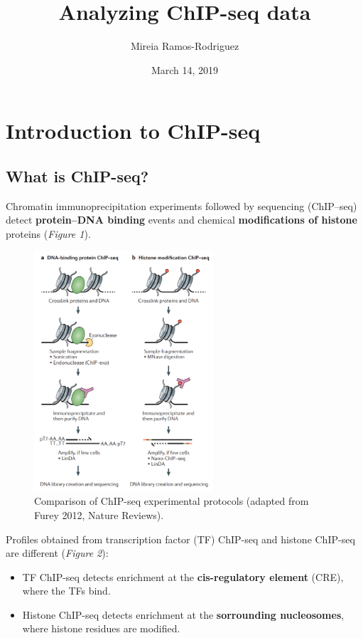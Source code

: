 \documentclass[]{article}
\title{Analyzing ChIP-seq data}
\author{Mireia Ramos-Rodriguez}
\date{March 14, 2019}
\providecommand{\tightlist}{%
  \setlength{\itemsep}{0pt}\setlength{\parskip}{0pt}}
\begin{document}
\maketitle

\section{Introduction to ChIP-seq}\label{introduction-to-chip-seq}

\subsection{What is ChIP-seq?}\label{what-is-chip-seq}

Chromatin immunoprecipitation experiments followed by sequencing
(ChIP--seq) detect \textbf{protein--DNA binding} events and chemical
\textbf{modifications of histone} proteins (\emph{Figure 1}).

\begin{figure}

{\centering \includegraphics[width=2.63in]{img/protocol_chipseq} 

}

\caption{Comparison of ChIP-seq experimental protocols (adapted from Furey 2012, Nature Reviews).}\label{fig:protocol}
\end{figure}

Profiles obtained from transcription factor (TF) ChIP-seq and histone
ChIP-seq are different (\emph{Figure 2}):

\begin{itemize}
\tightlist
\item
  TF ChIP-seq detects enrichment at the \textbf{cis-regulatory element}
  (CRE), where the TFs bind.
\item
  Histone ChIP-seq detects enrichment at the \textbf{sorrounding
  nucleosomes}, where histone residues are modified.
\end{itemize}
\end{document}
